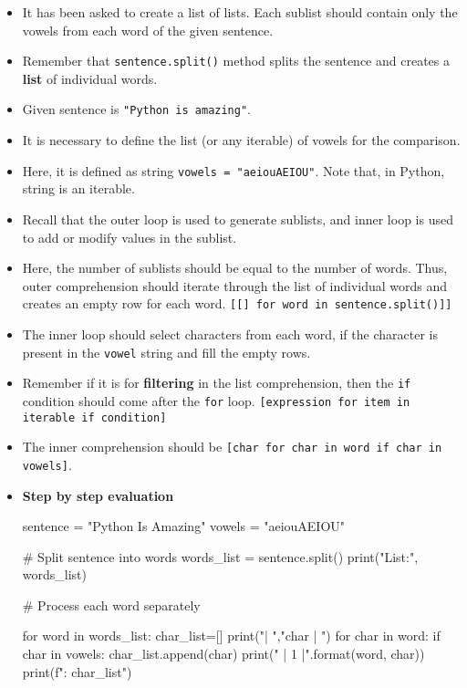 \documentclass[10pt]{extarticle}
\begin{document}
\begin{itemize}
    \item It has been asked to create a list of lists. Each sublist should contain only the vowels from each word of the given sentence.
    \item Remember that \colorbox{gray!20}{\texttt{sentence.split()}} method splits the sentence and creates a \textbf{list} of individual words.
    \item Given sentence is \colorbox{gray!20}{\texttt{"Python is amazing"}}. 
    \item It is necessary to define the list (or any iterable) of vowels for the comparison. 
    \item Here, it is defined as string \colorbox{gray!20}{\texttt{vowels = "aeiouAEIOU"}}. Note that, in Python, string is an iterable. 
    \item Recall that the outer loop is used to generate sublists, and inner loop is used to add or modify values in the sublist.
    \item Here, the number of sublists should be equal to the number of words. Thus, outer comprehension should iterate through the list of individual words and creates an empty row for each word. \colorbox{gray!20}{\texttt{[[] for word in sentence.split()]]}} 
    \item The inner loop should select characters from each word, if the character is present in the \texttt{vowel} string and fill the empty rows. 
    \item Remember if it is for \textbf{filtering} in the list comprehension, then the \texttt{if} condition should come after the \texttt{for} loop. \colorbox{gray!20}{\texttt{[expression for item in iterable if condition]}}  
    \item The inner comprehension should be \colorbox{gray!20}{\texttt{[char for char in word if char in vowels]}}.
    \item \textbf{Step by step evaluation}
    \begin{tcolorbox}[colback=gray!20, colframe=gray!50, sharp corners=southwest]
    \begin{pycode}
sentence = "Python Is Amazing"
vowels = "aeiouAEIOU"

# Split sentence into words
words_list = sentence.split()
print("\nWords List:", words_list)  

# Process each word separately

for word in words_list:
  char_list=[]
  print("\nword | ","char | ")
  for char in word:
    if char in vowels: 
      char_list.append(char)
      print(" | {1} |".format(word, char))
  print(f"\nSublist: {char_list}")  

    \end{pycode}
    \end{tcolorbox}
\end{itemize}
\end{document}
